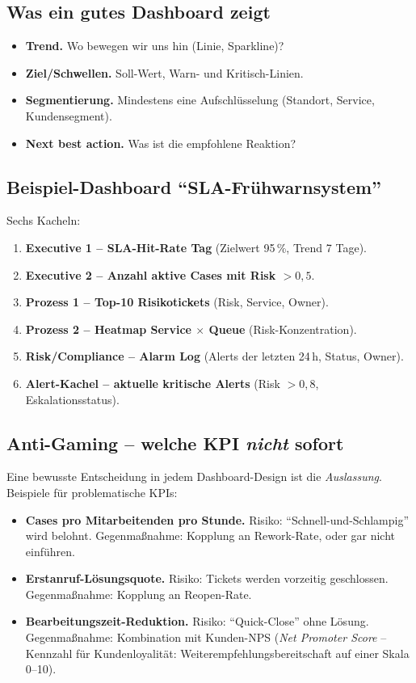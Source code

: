 \documentclass[11pt,a4paper,oneside]{article}
\newcommand{\fachbegriff}[1]{\textbf{#1}}
\begin{document}
\subsection{Was ein gutes Dashboard zeigt}

\begin{itemize}
  \item \fachbegriff{Trend.} Wo bewegen wir uns hin (Linie, Sparkline)?
  \item \fachbegriff{Ziel/Schwellen.} Soll-Wert, Warn- und Kritisch-Linien.
  \item \fachbegriff{Segmentierung.} Mindestens eine Aufschlüsselung (Standort, Service, Kunden\-segment).
  \item \fachbegriff{Next best action.} Was ist die empfohlene Reaktion?
\end{itemize}

\subsection{Beispiel-Dashboard ``SLA-Frühwarnsystem''}

Sechs Kacheln:

\begin{enumerate}
  \item \textbf{Executive 1 -- SLA-Hit-Rate Tag} (Zielwert 95\,\%, Trend 7 Tage).
  \item \textbf{Executive 2 -- Anzahl aktive Cases mit Risk $>0,5$}.
  \item \textbf{Prozess 1 -- Top-10 Risikotickets} (Risk, Service, Owner).
  \item \textbf{Prozess 2 -- Heatmap Service $\times$ Queue} (Risk-Konzentration).
  \item \textbf{Risk/Compliance -- Alarm Log} (Alerts der letzten 24\,h, Status, Owner).
  \item \textbf{Alert-Kachel -- aktuelle kritische Alerts} (Risk $>0,8$, Eskalations\-status).
\end{enumerate}

\subsection{Anti-Gaming -- welche KPI \emph{nicht} sofort}

Eine bewusste Entscheidung in jedem Dashboard-Design ist die \emph{Auslassung}. Beispiele für problematische KPIs:

\begin{itemize}
  \item \fachbegriff{Cases pro Mitarbeitenden pro Stunde.} Risiko: ``Schnell-und-Schlampig'' wird belohnt. Gegenmaßnahme: Kopplung an Rework-Rate, oder gar nicht einführen.
  \item \fachbegriff{Erstanruf-Lösungsquote.} Risiko: Tickets werden vorzeitig geschlossen. Gegenmaßnahme: Kopplung an Reopen-Rate.
  \item \fachbegriff{Bearbeitungs\-zeit-Reduktion.} Risiko: ``Quick-Close'' ohne Lösung. Gegenmaßnahme: Kombination mit Kunden-NPS (\emph{Net Promoter Score} -- Kennzahl für Kundenloyalität: Weiterempfehlungsbereitschaft auf einer Skala 0--10).
\end{itemize}
\end{document}

